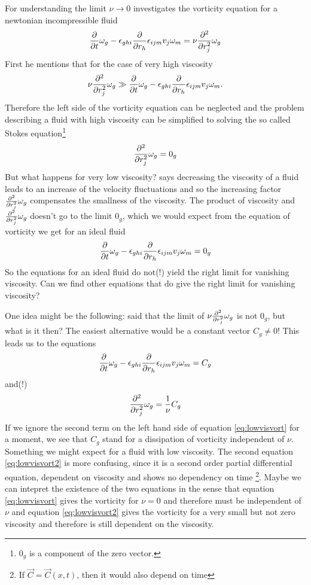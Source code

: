 For understanding the limit $\nu \longrightarrow 0$ \citet{Feynman1964}
investigates the vorticity equation for a newtonian incompressible fluid
\begin{align}
\frac{\partial}{\partial t}\omega_g
-\epsilon_{ghi}\frac{\partial}{\partial r_h} \epsilon_{ijm} v_j \omega_m =
\nu \frac{\partial^2}{\partial r_j^2}\omega_g
\end{align}
First he mentions that for the case of very high viscosity 
\begin{align}
\nu \frac{\partial^2}{\partial r_j^2}\omega_g \gg \frac{\partial}{\partial t}\omega_g
-\epsilon_{ghi}\frac{\partial}{\partial r_h} \epsilon_{ijm} v_j \omega_m.
\end{align}
Therefore the left side of the vorticity equation can be neglected and 
the problem describing a fluid with high viscosity can be simplified to solving
the so called Stokes equation\footnote{$0_g$ is a component of the zero vector.}
\begin{align}
\frac{\partial^2}{\partial r_j^2}\omega_g =  0_g
\end{align}
But what happens for very low viscosity? \citet{Feynman1964} says decreasing
the viscosity of a fluid leads to an increase of the velocity fluctuations and
so the increasing factor $\frac{\partial^2}{\partial r_j^2}\omega_g$ compensates the smallness of
the viscosity. The product of viscosity and $\frac{\partial^2}{\partial r_j^2}\omega_g$ doesn't go to
the limit $0_g$, which we would expect from the equation of vorticity we get
for an ideal fluid
\begin{align}
\frac{\partial}{\partial t}\omega_g
-\epsilon_{ghi}\frac{\partial}{\partial r_h} \epsilon_{ijm} v_j \omega_m =0_g  
\end{align}
So the equations for an ideal fluid do not(!) yield the right limit for
vanishing viscosity. Can we find other equations that do give the right limit
for vanishing viscosity? 

One idea might be the following: \citet{Feynman1964} said that the limit
of $\nu \frac{\partial^2}{\partial r_j^2}\omega_g$ is not $0_g$, but what is it then? The
easiest alternative would be a constant vector $C_g \neq 0$! This leads us to
the equations
\begin{align}
\frac{\partial}{\partial t}\omega_g
-\epsilon_{ghi}\frac{\partial}{\partial r_h} \epsilon_{ijm} v_j \omega_m = C_g 
\label{eq:lowvisvort} 
\end{align}
and(!)
\begin{align}
 \frac{\partial^2}{\partial r_j^2}\omega_g = \frac{1}{\nu} C_g
\label{eq:lowvisvort2} 
\end{align}
If we ignore the second term on the left hand side of equation
\eqref{eq:lowvisvort} for a moment, we see that $C_g$ stand for
a dissipation of vorticity independent of $\nu$. Something we might expect
for a fluid with low viscosity. The second equation \eqref{eq:lowvisvort2} is
more confusing, since it is a second order partial differential equation,
dependent on viscosity and shows no dependency on time
\footnote{If $\vec{C}=\vec{C}(x,t)$, then it would also depend on time}.
Maybe we can intepret the existence of the two equations in the sense that 
equation \eqref{eq:lowvisvort} gives the vorticity for $\nu=0$ and therefore
must be independent of $\nu$ and equation \eqref{eq:lowvisvort2} gives the
vorticity for a very small but not zero viscosity and therefore is still
dependent on the viscosity.

